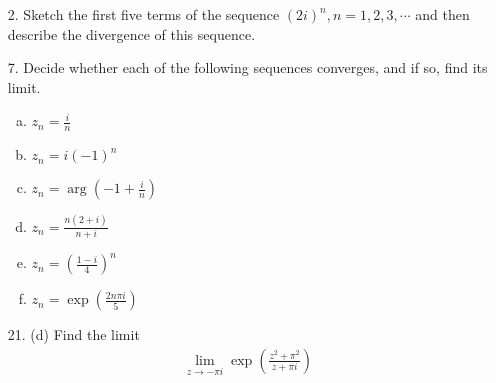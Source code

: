\documentclass{article}
\begin{document}
\begin{itemize}
	\item[2.] Sketch the first five terms of the sequence $(2i)^n, n=1, 2, 3, \cdots$ and then describe the divergence of this sequence.

	\item[7.] Decide whether each of the following sequences converges, and if so, find its limit.
		\begin{enumerate}[(a)]
			\item $z_n=\frac{i}{n}$

			\item $z_n=i(-1)^n$

			\item $z_n=\arg\left( -1+\frac{i}{n} \right)$

			\item $z_n=\frac{n(2+i)}{n+i}$

			\item $z_n=\left( \frac{1-i}{4} \right)^n$
				
			\item $z_n=\exp\left( \frac{2n\pi i}{5} \right)$
				
		\end{enumerate}

	\item[21.] (d) Find the limit
		\begin{align*}
			\lim_{z\to-\pi i} \exp\left( \frac{z^2+\pi^2}{z+\pi i} \right)
		\end{align*}
		
\end{itemize}
\end{document}
